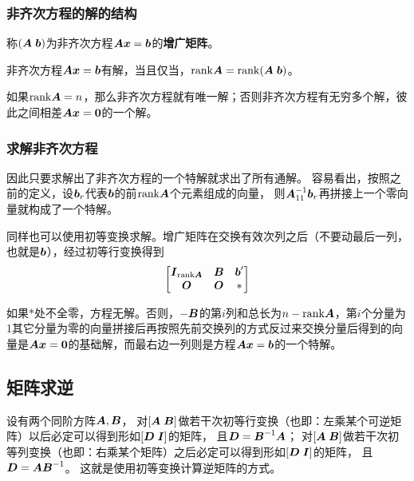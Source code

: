 \documentclass[UTF8]{ctexart}
\theoremstyle{definition}
\begin{document}
\hypertarget{ux975eux9f50ux6b21ux65b9ux7a0bux7684ux89e3ux7684ux7ed3ux6784}{%
\subsubsection{非齐次方程的解的结构}\label{ux975eux9f50ux6b21ux65b9ux7a0bux7684ux89e3ux7684ux7ed3ux6784}}

称$(\vb*{A} \; \vb*{b})$为非齐次方程$\vb*{A} \vb*{x} = \vb*{b}$的\textbf{增广矩阵}。

非齐次方程$\vb*{A} \vb*{x} = \vb*{b}$有解，当且仅当，$\mathrm{rank}\vb*{A} = \mathrm{rank}(\vb*{A} \; \vb*{b})$。

如果$\mathrm{rank}\vb*{A} = n$，那么非齐次方程就有唯一解；否则非齐次方程有无穷多个解，彼此之间相差$\vb*{A} \vb*{x} = \vb*{0}$的一个解。

\hypertarget{ux6c42ux89e3ux975eux9f50ux6b21ux65b9ux7a0b}{%
\subsubsection{求解非齐次方程}\label{ux6c42ux89e3ux975eux9f50ux6b21ux65b9ux7a0b}}

因此只要求解出了非齐次方程的一个特解就求出了所有通解。
容易看出，按照之前的定义，设$\vb*{b}_r$代表$\vb*{b}$的前$\mathrm{rank}\vb*{A}$个元素组成的向量，
则$\vb*{A}_{11}^{-1} \vb*{b}_r$再拼接上一个零向量就构成了一个特解。

同样也可以使用初等变换求解。增广矩阵在交换有效次列之后（不要动最后一列，也就是$\vb*{b}$），经过初等行变换得到
\[
\left[
    \begin{matrix}
        \vb*{I}_{\mathrm{rank}\vb*{A}} & \vb*{B} & \vb*{b}' \\
        \vb*{O} & \vb*{O} & *
    \end{matrix}    
\right]
\]

如果$*$处不全零，方程无解。否则，$-\vb*{B}$的第$i$列和总长为$n-\mathrm{rank}\vb*{A}$，第$i$个分量为1其它分量为零的向量拼接后再按照先前交换列的方式反过来交换分量后得到的向量是$\vb*{A} \vb*{x} = \vb*{0}$的基础解，而最右边一列则是方程$\vb*{A} \vb*{x} = \vb*{b}$的一个特解。

\subsection{矩阵求逆}

设有两个同阶方阵$\vb*{A}, \vb*{B}$，
对$[\vb*{A} \; \vb*{B}]$做若干次初等行变换（也即：左乘某个可逆矩阵）以后必定可以得到形如$[\vb*{D} \; \vb*{I}]$的矩阵，
且$\vb*{D} = \vb*{B}^{-1} \vb*{A}$；
对$[\vb*{A} \; \vb*{B}]$做若干次初等列变换（也即：右乘某个矩阵）之后必定可以得到形如$[\vb*{D} \; \vb*{I}]$的矩阵，
且$\vb*{D}=\vb*{A} \vb*{B}^{-1}$。
这就是使用初等变换计算逆矩阵的方式。
\end{document}

